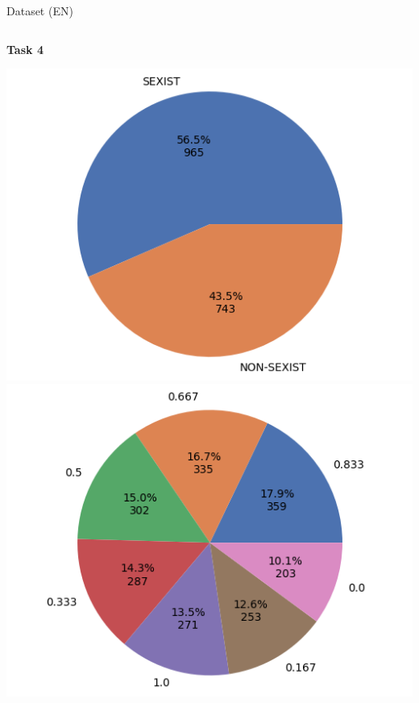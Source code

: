 \begin{frame}{Dataset (EN)}
    \begin{columns}[T]
        \begin{column}{0.3\textwidth}
            \centering
            \textbf{Task 4}

            \includegraphics[height=0.4\textheight, width=\textwidth, keepaspectratio]{images/t4_en_hard_presentacion.png}%
            \vfill
            \includegraphics[height=0.4\textheight, width=\textwidth, keepaspectratio]{images/t4_en_soft_presentacion.png}%
        \end{column}


\end{columns}
\end{frame}
